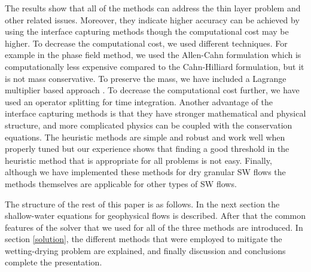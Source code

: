 \documentclass[review]{elsarticle}
\begin{document}
 The results show that all of the methods can address the thin layer problem and other 
related issues. Moreover, they indicate higher accuracy can be achieved by using the interface capturing methods though the computational cost may be higher. To decrease the computational cost, we used different techniques. For example in the phase field method, we used the Allen-Cahn formulation which is computationally less 
expensive compared to the Cahn-Hilliard formulation, but it is not mass conservative. To preserve the mass, we have included a Lagrange multiplier based approach \cite{Kim2014,Yang2006}. To decrease the computational cost further, we have used an operator splitting for time integration.
Another advantage of the interface capturing methods is that they have stronger mathematical and physical structure, and more complicated physics can be coupled with the conservation equations. The heuristic methods are simple and robust and work well when properly tuned but our experience shows that finding a good threshold in the heuristic method that is appropriate for all problems is not easy.  Finally, although we have implemented these methods for dry granular  SW flows the methods themselves are applicable for other types of SW flows.
 

The structure of the rest of this paper is as follows. In the next section the shallow-water equations for geophysical flows is described. After that the common features of the solver that we used for all of the three methods are 
introduced. In section \ref{solution}, the different methods that were employed to mitigate the wetting-drying problem are explained, and finally discussion and conclusions complete the presentation.
 
 
 
\end{document}
